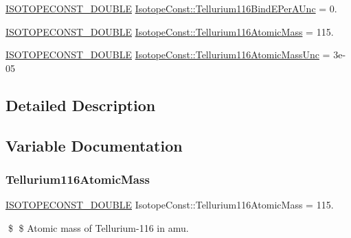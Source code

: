 \begin{DoxyCompactItemize}
\mbox{\hyperlink{group___isotope_const-_macros_ga8f45a7272ce02c0b4c65c44636ed719a}{I\+S\+O\+T\+O\+P\+E\+C\+O\+N\+S\+T\+\_\+\+D\+O\+U\+B\+LE}} \mbox{\hyperlink{group___isotope_const-_tellurium-_te116_ga5830fbd6720861aa213488d361143740}{Isotope\+Const\+::\+Tellurium116\+Bind\+E\+Per\+A\+Unc}} = 0.
\item 
\mbox{\hyperlink{group___isotope_const-_macros_ga8f45a7272ce02c0b4c65c44636ed719a}{I\+S\+O\+T\+O\+P\+E\+C\+O\+N\+S\+T\+\_\+\+D\+O\+U\+B\+LE}} \mbox{\hyperlink{group___isotope_const-_tellurium-_te116_gaf090c57ce9c3fc7fd0e10f7b5e5dbbe2}{Isotope\+Const\+::\+Tellurium116\+Atomic\+Mass}} = 115.
\item 
\mbox{\hyperlink{group___isotope_const-_macros_ga8f45a7272ce02c0b4c65c44636ed719a}{I\+S\+O\+T\+O\+P\+E\+C\+O\+N\+S\+T\+\_\+\+D\+O\+U\+B\+LE}} \mbox{\hyperlink{group___isotope_const-_tellurium-_te116_ga14b0e91bfbbe3057f7b02bf7d1c51004}{Isotope\+Const\+::\+Tellurium116\+Atomic\+Mass\+Unc}} = 3e-\/05
\end{DoxyCompactItemize}


\subsection{Detailed Description}


\subsection{Variable Documentation}
\mbox{\label{group___isotope_const-_tellurium-_te116_gaf090c57ce9c3fc7fd0e10f7b5e5dbbe2}} 
\subsubsection{\texorpdfstring{Tellurium116\+Atomic\+Mass}{Tellurium116AtomicMass}}
{\footnotesize\ttfamily \mbox{\hyperlink{group___isotope_const-_macros_ga8f45a7272ce02c0b4c65c44636ed719a}{I\+S\+O\+T\+O\+P\+E\+C\+O\+N\+S\+T\+\_\+\+D\+O\+U\+B\+LE}} Isotope\+Const\+::\+Tellurium116\+Atomic\+Mass = 115.}

\$ \$ Atomic mass of Tellurium-\/116 in amu. \mbox{\label{group___isotope_const-_tellurium-_te116_ga14b0e91bfbbe3057f7b02bf7d1c51004}} 
